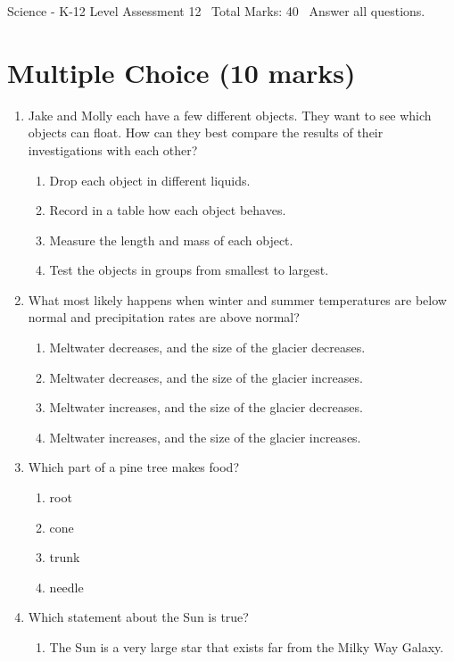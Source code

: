 \documentclass[12pt]{article}
\begin{document}
\begin{center}
Science - K-12 Level Assessment 12 \
Total Marks: 40 \
Answer all questions.
\end{center}

\section*{Multiple Choice (10 marks)}
\begin{enumerate}[label=\arabic*.]
\item Jake and Molly each have a few different objects. They want to see which objects can float. How can they best compare the results of their investigations with each other?
\begin{enumerate}[label=(\alph*)]
    \item Drop each object in different liquids.
    \item Record in a table how each object behaves.
    \item Measure the length and mass of each object.
    \item Test the objects in groups from smallest to largest.
\end{enumerate}
\item What most likely happens when winter and summer temperatures are below normal and precipitation rates are above normal?
\begin{enumerate}[label=(\alph*)]
    \item Meltwater decreases, and the size of the glacier decreases.
    \item Meltwater decreases, and the size of the glacier increases.
    \item Meltwater increases, and the size of the glacier decreases.
    \item Meltwater increases, and the size of the glacier increases.
\end{enumerate}
\item Which part of a pine tree makes food?
\begin{enumerate}[label=(\alph*)]
    \item root
    \item cone
    \item trunk
    \item needle
\end{enumerate}
\item Which statement about the Sun is true?
\begin{enumerate}[label=(\alph*)]
    \item The Sun is a very large star that exists far from the Milky Way Galaxy.

\end{enumerate}
\end{enumerate}
\end{document}
